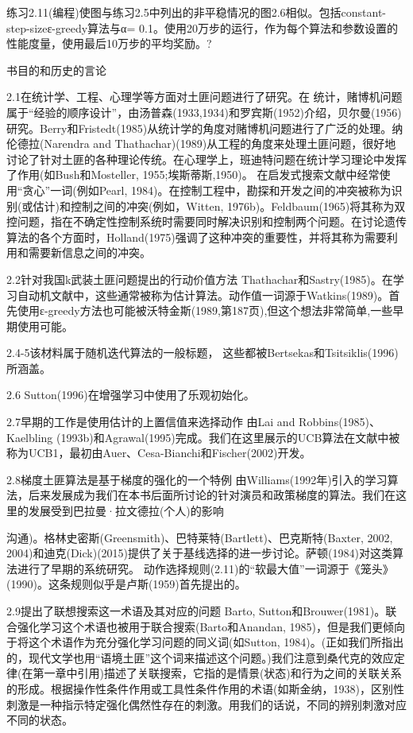 练习2.11(编程)使图与练习2.5中列出的非平稳情况的图2.6相似。包括constant-step-sizeε-greedy算法与α= 0.1。使用20万步的运行，作为每个算法和参数设置的性能度量，使用最后10万步的平均奖励。?


书目的和历史的言论

2.1在统计学、工程、心理学等方面对土匪问题进行了研究。在
统计，赌博机问题属于“经验的顺序设计”，由汤普森(1933,1934)和罗宾斯(1952)介绍，贝尔曼(1956)研究。Berry和Fristedt(1985)从统计学的角度对赌博机问题进行了广泛的处理。纳伦德拉(Narendra and Thathachar)(1989)从工程的角度来处理土匪问题，很好地讨论了针对土匪的各种理论传统。在心理学上，班迪特问题在统计学习理论中发挥了作用(如Bush和Mosteller, 1955;埃斯蒂斯,1950)。
在启发式搜索文献中经常使用“贪心”一词(例如Pearl, 1984)。在控制工程中，勘探和开发之间的冲突被称为识别(或估计)和控制之间的冲突(例如，Witten, 1976b)。Feldbaum(1965)将其称为双控问题，指在不确定性控制系统时需要同时解决识别和控制两个问题。在讨论遗传算法的各个方面时，Holland(1975)强调了这种冲突的重要性，并将其称为需要利用和需要新信息之间的冲突。

2.2针对我国k武装土匪问题提出的行动价值方法
Thathachar和Sastry(1985)。在学习自动机文献中，这些通常被称为估计算法。动作值一词源于Watkins(1989)。首先使用ε-greedy方法也可能被沃特金斯(1989,第187页),但这个想法非常简单,一些早期使用可能。

2.4-5该材料属于随机迭代算法的一般标题，
这些都被Bertsekas和Tsitsiklis(1996)所涵盖。

2.6 Sutton(1996)在增强学习中使用了乐观初始化。

2.7早期的工作是使用估计的上置信值来选择动作
由Lai and Robbins(1985)、Kaelbling (1993b)和Agrawal(1995)完成。我们在这里展示的UCB算法在文献中被称为UCB1，最初由Auer、Cesa-Bianchi和Fischer(2002)开发。

2.8梯度土匪算法是基于梯度的强化的一个特例
由Williams(1992年)引入的学习算法，后来发展成为我们在本书后面所讨论的针对演员和政策梯度的算法。我们在这里的发展受到巴拉曼·拉文德拉(个人)的影响

沟通)。格林史密斯(Greensmith)、巴特莱特(Bartlett)、巴克斯特(Baxter, 2002, 2004)和迪克(Dick)(2015)提供了关于基线选择的进一步讨论。萨顿(1984)对这类算法进行了早期的系统研究。
动作选择规则(2.11)的“软最大值”一词源于《笼头》(1990)。这条规则似乎是卢斯(1959)首先提出的。

2.9提出了联想搜索这一术语及其对应的问题
Barto, Sutton和Brouwer(1981)。联合强化学习这个术语也被用于联合搜索(Barto和Anandan, 1985)，但是我们更倾向于将这个术语作为充分强化学习问题的同义词(如Sutton, 1984)。(正如我们所指出的，现代文学也用“语境土匪”这个词来描述这个问题。)我们注意到桑代克的效应定律(在第一章中引用)描述了关联搜索，它指的是情景(状态)和行为之间的关联关系的形成。根据操作性条件作用或工具性条件作用的术语(如斯金纳，1938)，区别性刺激是一种指示特定强化偶然性存在的刺激。用我们的话说，不同的辨别刺激对应不同的状态。

